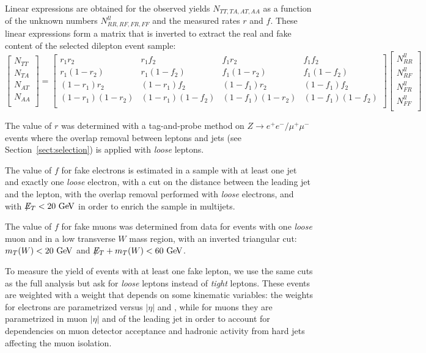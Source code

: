 Linear expressions are obtained for the observed yields $N_{TT,TA,AT,AA}$ as a function 
of the unknown numbers $N_{RR,RF,FR,FF}^{ll}$ and the measured rates $r$ and $f$. 
These linear expressions form a 
matrix that is inverted to extract the real and fake content of the selected dilepton event sample:
\begin{equation}
  \begin{bmatrix} N_{TT} \\ N_{TA} \\ N_{AT} \\ N_{AA} \\ \end{bmatrix} =
  \begin{bmatrix}  r_1 r_2        & r_1 f_2       & f_1 r_2        & f_1 f_2         \\
    r_1 (1-r_2)     & r_1 (1-f_2)     & f_1 (1-r_2)     & f_1 (1-f_2)     \\
    (1-r_1)r_2    & (1-r_1)f_2     & (1-f_1)r_2     & (1-f_1)f_2     \\
    (1-r_1)(1-r_2) & (1-r_1)(1-f_2) & (1-f_1)(1-r_2) & (1-f_1)(1-f_2) \\             
  \end{bmatrix}
  \begin{bmatrix} N_{RR}^{ll} \\ N_{RF}^{ll} \\ N_{FR}^{ll} \\ N_{FF}^{ll} \\ \end{bmatrix}
  \label{matrice}
\end{equation}

The value of $r$ was determined with a tag-and-probe method on 
$Z \rightarrow e^+e^-/\mu^+\mu^-$ events where the overlap removal between leptons and jets (see 
Section~\ref{sect:selection}) is applied with {\it loose} leptons.

The value of $f$ for fake electrons is estimated in a sample with at least one jet and exactly one 
{\it loose} electron, 
with a cut on the distance between the leading jet and the lepton, with the overlap 
removal performed with {\it loose} electrons, and with $\met{}<20 \GeV$ in order to 
enrich the sample in multijets.

The value of $f$ for fake muons was determined from data for events with one {\it loose} muon and
in a low transverse $W$ mass region, with an 
inverted triangular cut: $m_T(W)<20 \GeV$ and $\met{}+m_T(W)<60 \GeV$. 

To measure the yield of events with at least one fake lepton, 
we use the same cuts as the full analysis but ask for 
{\it loose} leptons instead of {\it tight} leptons. These events are weighted with a weight that depends
on some kinematic variables: the weights for electrons 
are parametrized versus $|\eta|$ and \pt{}, while for muons they are parametrized in muon 
$|\eta|$ and \pt{} of the leading jet in order to account for dependencies on muon detector acceptance and 
hadronic activity from hard jets affecting the muon isolation.

